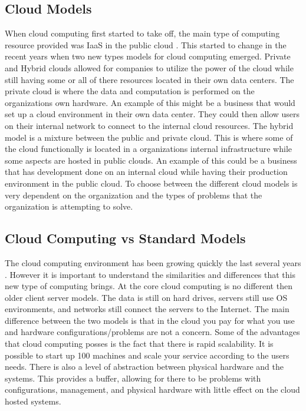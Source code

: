 \documentclass[12pt]{article}
\begin{document}
\subsection{Cloud Models}
When cloud computing first started to take off, the main type of computing resource provided was IaaS in the public cloud \cite{sourcedigit}. This started to change in the recent years when two new types models for cloud computing emerged. Private and Hybrid clouds allowed for companies to utilize the power of the cloud while still having some or all of there resources located in their own data centers. The private cloud is where the data and computation is performed on the organizations own hardware. An example of this might be a business that would set up a cloud environment in their own data center. They could then allow users on their internal network to connect to the internal cloud resources. The hybrid model is a mixture between the public and private cloud. This is where some of the cloud functionally is located in a organizations internal infrastructure while some aspects are hosted in public clouds. An example of this could be a business that has development done on an internal cloud while having their production environment in the public cloud. To choose between the different cloud models is very dependent on the organization and the types of problems that the organization is attempting to solve.

\subsection{Cloud Computing vs Standard Models}
The cloud computing environment has been growing quickly the last several years \cite{Vaquero}. However it is important to understand the similarities and differences that this new type of computing brings. At the core cloud computing is no different then older client server models. The data is still on hard drives, servers still use OS environments, and networks still connect the servers to the Internet. The main difference between the two models is that in the cloud you pay for what you use and hardware configurations/problems are not a concern. Some of the advantages that cloud computing posses is the fact that there is rapid scalability. It is possible to start up 100 machines and scale your service according to the users needs. There is also a level of abstraction between physical hardware and the systems. This provides a buffer, allowing for there to be problems with configurations, management, and physical hardware with little effect on the cloud hosted systems.
\end{document}
